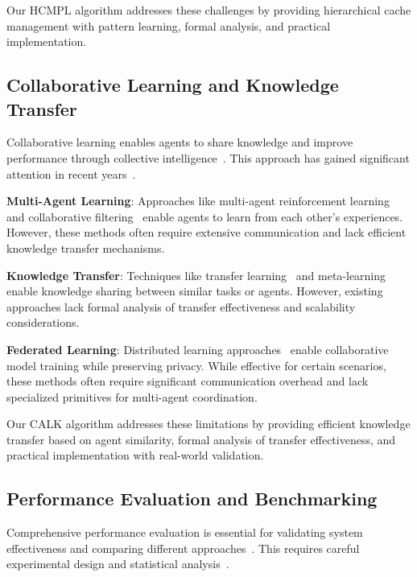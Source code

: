 \documentclass[conference]{IEEEtran}
\begin{document}
Our HCMPL algorithm addresses these challenges by providing hierarchical cache management with pattern learning, formal analysis, and practical implementation.

\subsection{Collaborative Learning and Knowledge Transfer}

Collaborative learning enables agents to share knowledge and improve performance through collective intelligence~\cite{marl2018,collab_filter2019,goodfellow2016deep}. This approach has gained significant attention in recent years~\cite{bishop2006pattern,hastie2009elements}.

\textbf{Multi-Agent Learning}: Approaches like multi-agent reinforcement learning~\cite{marl2018} and collaborative filtering~\cite{collab_filter2019} enable agents to learn from each other's experiences. However, these methods often require extensive communication and lack efficient knowledge transfer mechanisms.

\textbf{Knowledge Transfer}: Techniques like transfer learning~\cite{transfer_learning2019} and meta-learning~\cite{meta_learning2020} enable knowledge sharing between similar tasks or agents. However, existing approaches lack formal analysis of transfer effectiveness and scalability considerations.

\textbf{Federated Learning}: Distributed learning approaches~\cite{federated_learning2021} enable collaborative model training while preserving privacy. While effective for certain scenarios, these methods often require significant communication overhead and lack specialized primitives for multi-agent coordination.

Our CALK algorithm addresses these limitations by providing efficient knowledge transfer based on agent similarity, formal analysis of transfer effectiveness, and practical implementation with real-world validation.

\subsection{Performance Evaluation and Benchmarking}

Comprehensive performance evaluation is essential for validating system effectiveness and comparing different approaches~\cite{spec2019,tpc2020,jain1991art}. This requires careful experimental design and statistical analysis~\cite{menasce2004performance,gunther2007guerilla}.
\end{document}
